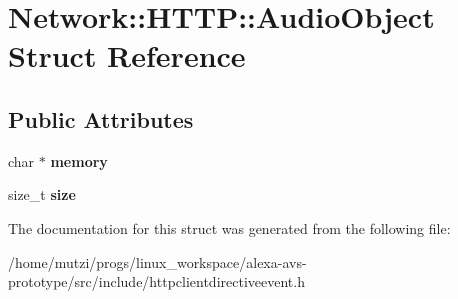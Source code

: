 \hypertarget{structNetwork_1_1HTTP_1_1AudioObject}{}\section{Network\+:\+:H\+T\+TP\+:\+:Audio\+Object Struct Reference}
\label{structNetwork_1_1HTTP_1_1AudioObject}
\subsection*{Public Attributes}
\begin{DoxyCompactItemize}
\item 
\mbox{\label{structNetwork_1_1HTTP_1_1AudioObject_a3a234bdfcad33a975fd34587a4945a01}} 
char $\ast$ {\bfseries memory}
\item 
\mbox{\label{structNetwork_1_1HTTP_1_1AudioObject_ac9218f629c3ece8bfb1ae459fdc98a1f}} 
size\+\_\+t {\bfseries size}
\end{DoxyCompactItemize}


The documentation for this struct was generated from the following file\+:\begin{DoxyCompactItemize}
\item 
/home/mutzi/progs/linux\+\_\+workspace/alexa-\/avs-\/prototype/src/include/httpclientdirectiveevent.\+h\end{DoxyCompactItemize}
